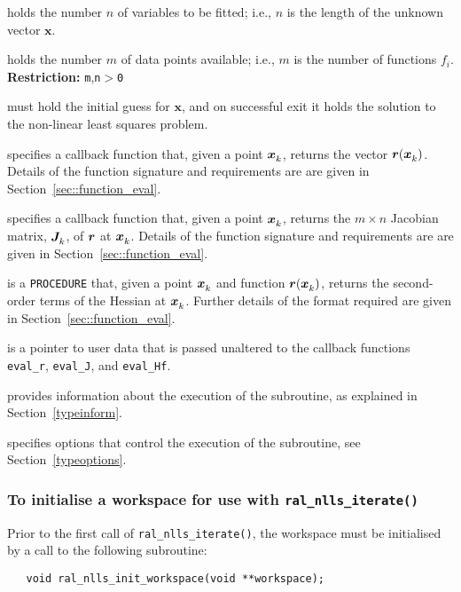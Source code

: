 \documentclass{spec}
\begin{document}
\begin{description}
 holds the number $n$ of
variables to be fitted; i.e., $n$ is the length of the unknown vector $\bm x$.

 holds the number $m$ of
data points available; i.e., $m$ is the number of functions $f_i$.
\textbf{Restriction:} \texttt{m},\texttt{n}$>$\texttt{0}

 must hold the initial guess for $\bm x$, and on
successful exit it holds the solution to the non-linear least squares problem.

 specifies a callback function that, given a point ${\bm x}_{k}^{}$,
returns the vector ${\bm r}({\bm x}_{k}^{})$. Details of the function signature and
requirements are are given in Section~\ref{sec::function_eval}.

 specifies a callback function that, given a point ${\bm x}_{k}^{}$,
returns the $m \times n$ Jacobian matrix, ${\bm J}_{k}^{}$, of ${\bm r}$ at ${\bm x}_{k}^{}$. Details of the function signature and requirements are are given in
Section~\ref{sec::function_eval}.

 is a {\tt PROCEDURE} that, given a point ${\bm x}_{k}^{}$
and function ${\bm r}({\bm x}_{k}^{})$, returns the second-order terms of the Hessian at ${\bm x}_{k}^{}$.
Further details of the format required are given in Section~\ref{sec::function_eval}.

 is a pointer to user data that is passed unaltered to the callback
functions {\tt eval\_r}, {\tt eval\_J}, and {\tt eval\_Hf}.

 provides information about the execution
of the subroutine, as explained in Section~\ref{typeinform}.

 specifies options that control the execution of the subroutine,
see Section~\ref{typeoptions}.

\end{description}

\subsubsection{To initialise a workspace for use with \texttt{ral\_nlls\_iterate()}}

Prior to the first call of \texttt{ral\_nlls\_iterate()}, the workspace must be
initialised by a call to the following subroutine:
\begin{verbatim}
   void ral_nlls_init_workspace(void **workspace);
\end{verbatim}
\end{document}
